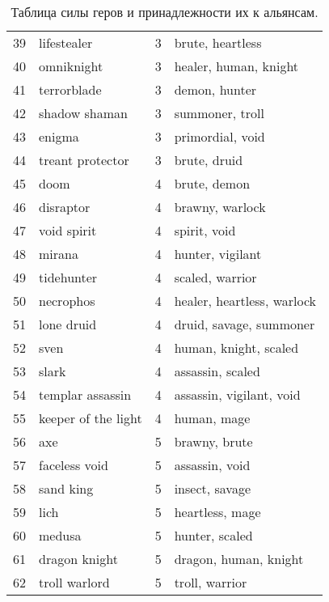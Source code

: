 \documentclass{article}
\begin{document}
\begin{table}
{\begin{tabular}{llrl}
39 &          lifestealer &      3 &               brute, heartless \\
40 &           omniknight &      3 &          healer, human, knight \\
41 &          terrorblade &      3 &                  demon, hunter \\
42 &        shadow shaman &      3 &                summoner, troll \\
43 &               enigma &      3 &               primordial, void \\
44 &     treant protector &      3 &                   brute, druid \\
45 &                 doom &      4 &                   brute, demon \\
46 &            disraptor &      4 &               brawny, warlock  \\
47 &          void spirit &      4 &                   spirit, void \\
48 &               mirana &      4 &               hunter, vigilant \\
49 &           tidehunter &      4 &               scaled, warrior  \\
50 &            necrophos &      4 &    healer, heartless, warlock  \\
51 &           lone druid &      4 &        druid, savage, summoner \\
52 &                 sven &      4 &          human, knight, scaled \\
53 &                slark &      4 &               assassin, scaled \\
54 &     templar assassin &      4 &       assassin, vigilant, void \\
55 &  keeper of the light &      4 &                    human, mage \\
56 &                  axe &      5 &                  brawny, brute \\
57 &        faceless void &      5 &                 assassin, void \\
58 &            sand king &      5 &                 insect, savage \\
59 &                 lich &      5 &                heartless, mage \\
60 &               medusa &      5 &                 hunter, scaled \\
61 &        dragon knight &      5 &          dragon, human, knight \\
62 &        troll warlord &      5 &                troll, warrior  \\
\bottomrule
\end{tabular}
}
\caption{Таблица силы геров и принадлежности их к альянсам. }
\end{table}
\end{document}
